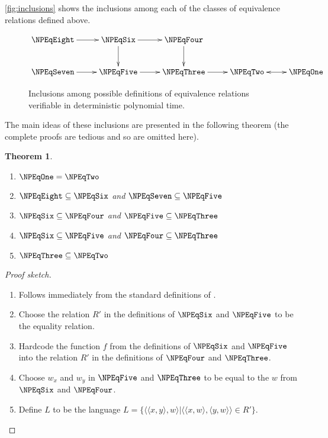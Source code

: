 \documentclass[draft]{article}
\newtheorem{theorem}{Theorem}[section]
\theoremstyle{definition} \newtheorem{openproblem}[openproblem]{Open problem}
\theoremstyle{definition} \newtheorem{definition}[definition]{Definition}
\theoremstyle{remark} \newtheorem{remark}{Remark}
\newenvironment{sketch}{\begin{proof}[Proof sketch]}{\end{proof}}
\newcommand{\pair}[2]{\langle#1,#2\rangle} %
\begin{document}
\autoref{fig:inclusions} shows the inclusions among each of the classes of equivalence relations defined above.
\begin{figure}
  \caption{\label{fig:inclusions}Inclusions among possible definitions of equivalence relations verifiable in deterministic polynomial time.}
  \begin{displaymath}
    \xymatrix{%
      \NPEqEight \ar[r] & \NPEqSix \ar[d] \ar[r] & \NPEqFour \ar[d] \\
      \NPEqSeven \ar[r] & \NPEqFive \ar[r] & \NPEqThree \ar[r] & \NPEqTwo \ar@{<->}[r] & \NPEqOne }
  \end{displaymath}
\end{figure}
The main ideas of these inclusions are presented in the following theorem (the complete proofs are tedious and so are omitted here).
\begin{theorem}\mbox{}
  \begin{enumerate}
  \item $\NPEqOne=\NPEqTwo$
  \item $\NPEqEight\subseteq\NPEqSix$ and $\NPEqSeven\subseteq\NPEqFive$
  \item $\NPEqSix\subseteq\NPEqFour$ and $\NPEqFive\subseteq\NPEqThree$
  \item $\NPEqSix\subseteq\NPEqFive$ and $\NPEqFour\subseteq\NPEqThree$
  \item $\NPEqThree\subseteq\NPEqTwo$
  \end{enumerate}
\end{theorem}
\begin{sketch}\mbox{}
  \begin{enumerate}
  \item Follows immediately from the standard definitions of \NP.
  \item Choose the relation $R'$ in the definitions of $\NPEqSix$ and $\NPEqFive$ to be the equality relation.
  \item Hardcode the function $f$ from the definitions of $\NPEqSix$ and $\NPEqFive$ into the relation $R'$ in the definitions of $\NPEqFour$ and $\NPEqThree$.
  \item Choose $w_x$ and $w_y$ in $\NPEqFive$ and $\NPEqThree$ to be equal to the $w$ from $\NPEqSix$ and $\NPEqFour$.
  \item Define $L$ to be the language $L=\{\pair{\pair{x}{y}}{w}|\pair{\pair{x}{w}}{\pair{y}{w}}\in R'\}$.\qedhere
  \end{enumerate}
\end{sketch}
\end{document}
